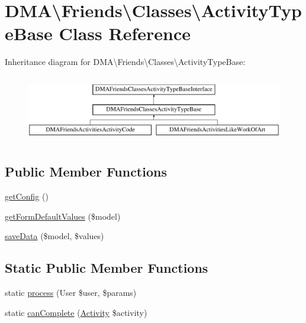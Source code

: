 \hypertarget{classDMA_1_1Friends_1_1Classes_1_1ActivityTypeBase}{\section{D\+M\+A\textbackslash{}Friends\textbackslash{}Classes\textbackslash{}Activity\+Type\+Base Class Reference}
\label{classDMA_1_1Friends_1_1Classes_1_1ActivityTypeBase}
}
Inheritance diagram for D\+M\+A\textbackslash{}Friends\textbackslash{}Classes\textbackslash{}Activity\+Type\+Base\+:\begin{figure}[H]
\begin{center}
\leavevmode
\includegraphics[height=3.000000cm]{d3/d35/classDMA_1_1Friends_1_1Classes_1_1ActivityTypeBase}
\end{center}
\end{figure}
\subsection*{Public Member Functions}
\begin{DoxyCompactItemize}
\item 
\hyperlink{classDMA_1_1Friends_1_1Classes_1_1ActivityTypeBase_ac540cd6b45fa5f41575523bbb300d18c}{get\+Config} ()
\item 
\hyperlink{classDMA_1_1Friends_1_1Classes_1_1ActivityTypeBase_ae46d0cc7e040eb4166e55a00d8d30dc8}{get\+Form\+Default\+Values} (\$model)
\item 
\hyperlink{classDMA_1_1Friends_1_1Classes_1_1ActivityTypeBase_a69d28814a4cc0c3798d1ab7a95e14ef3}{save\+Data} (\$model, \$values)
\end{DoxyCompactItemize}
\subsection*{Static Public Member Functions}
\begin{DoxyCompactItemize}
\item 
static \hyperlink{classDMA_1_1Friends_1_1Classes_1_1ActivityTypeBase_a772667f95a25c6aa44e31ce9c6903384}{process} (User \$user, \$params)
\item 
static \hyperlink{classDMA_1_1Friends_1_1Classes_1_1ActivityTypeBase_af5ddc6ea4b9d888873e6e499beaea396}{can\+Complete} (\hyperlink{classDMA_1_1Friends_1_1Models_1_1Activity}{Activity} \$activity)
\end{DoxyCompactItemize}
